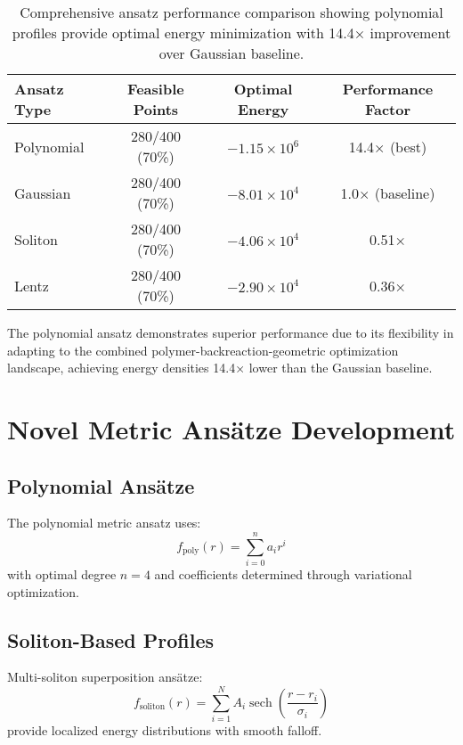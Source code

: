 \documentclass[11pt,a4paper]{article}
\begin{document}
\begin{table}[h]
\centering
\begin{tabular}{lccc}
\toprule
Ansatz Type & Feasible Points & Optimal Energy & Performance Factor \\
\midrule
Polynomial & 280/400 (70\%) & $-1.15 \times 10^6$ & 14.4× (best) \\
Gaussian & 280/400 (70\%) & $-8.01 \times 10^4$ & 1.0× (baseline) \\
Soliton & 280/400 (70\%) & $-4.06 \times 10^4$ & 0.51× \\
Lentz & 280/400 (70\%) & $-2.90 \times 10^4$ & 0.36× \\
\bottomrule
\end{tabular}
\caption{Comprehensive ansatz performance comparison showing polynomial profiles provide optimal energy minimization with 14.4× improvement over Gaussian baseline.}
\label{tab:ansatz_comparison}
\end{table}

The polynomial ansatz demonstrates superior performance due to its flexibility in adapting to the combined polymer-backreaction-geometric optimization landscape, achieving energy densities 14.4× lower than the Gaussian baseline.

\section{Novel Metric Ansätze Development}

\subsection{Polynomial Ansätze}

The polynomial metric ansatz uses:
\begin{equation}
f_{\text{poly}}(r) = \sum_{i=0}^{n} a_i r^i
\end{equation}
with optimal degree $n = 4$ and coefficients determined through variational optimization.

\subsection{Soliton-Based Profiles}

Multi-soliton superposition ansätze:
\begin{equation}
f_{\text{soliton}}(r) = \sum_{i=1}^{N} A_i \operatorname{sech}\left(\frac{r - r_i}{\sigma_i}\right)
\end{equation}
provide localized energy distributions with smooth falloff.
\end{document}

